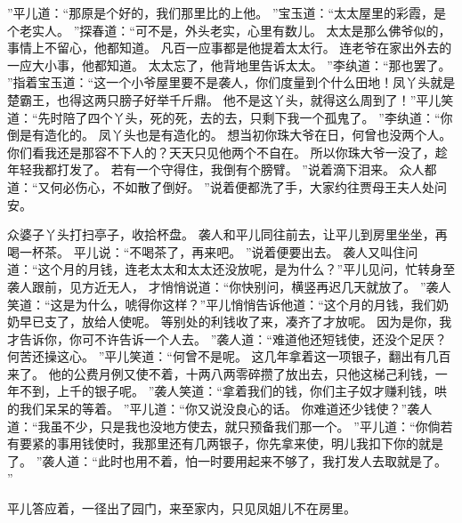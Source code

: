 ”平儿道：“那原是个好的，我们那里比的上他。
”宝玉道：“太太屋里的彩霞，是个老实人。
”探春道：“可不是，外头老实，心里有数儿。
太太是那么佛爷似的，事情上不留心，他都知道。
凡百一应事都是他提着太太行。
连老爷在家出外去的一应大小事，他都知道。
太太忘了，他背地里告诉太太。
”李纨道：“那也罢了。
”指着宝玉道：“这一个小爷屋里要不是袭人，你们度量到个什么田地！凤丫头就是楚霸王，也得这两只膀子好举千斤鼎。
他不是这丫头，就得这么周到了！”平儿笑道：“先时陪了四个丫头，死的死，去的去，只剩下我一个孤鬼了。
”李纨道：“你倒是有造化的。
凤丫头也是有造化的。
想当初你珠大爷在日，何曾也没两个人。
你们看我还是那容不下人的？天天只见他两个不自在。
所以你珠大爷一没了，趁年轻我都打发了。
若有一个守得住，我倒有个膀臂。
”说着滴下泪来。
众人都道：“又何必伤心，不如散了倒好。
”说着便都洗了手，大家约往贾母王夫人处问安。
\par
众婆子丫头打扫亭子，收拾杯盘。
袭人和平儿同往前去，让平儿到房里坐坐，再喝一杯茶。
平儿说：“不喝茶了，再来吧。
”说着便要出去。
袭人又叫住问道：“这个月的月钱，连老太太和太太还没放呢，是为什么？”平儿见问，忙转身至袭人跟前，见方近无人，
才悄悄说道：“你快别问，横竖再迟几天就放了。
”袭人笑道：“这是为什么，唬得你这样？”平儿悄悄告诉他道：“这个月的月钱，我们奶奶早已支了，放给人使呢。
等别处的利钱收了来，凑齐了才放呢。
因为是你，我才告诉你，你可不许告诉一个人去。
”袭人道：“难道他还短钱使，还没个足厌？何苦还操这心。
”平儿笑道：“何曾不是呢。
这几年拿着这一项银子，翻出有几百来了。
他的公费月例又使不着，十两八两零碎攒了放出去，只他这梯己利钱，一年不到，上千的银子呢。
”袭人笑道：“拿着我们的钱，你们主子奴才赚利钱，哄的我们呆呆的等着。
”平儿道：“你又说没良心的话。
你难道还少钱使？”袭人道：“我虽不少，只是我也没地方使去，就只预备我们那一个。
”平儿道：“你倘若有要紧的事用钱使时，我那里还有几两银子，你先拿来使，明儿我扣下你的就是了。
”袭人道：“此时也用不着，怕一时要用起来不够了，我打发人去取就是了。
”\par
平儿答应着，一径出了园门，来至家内，只见凤姐儿不在房里。
